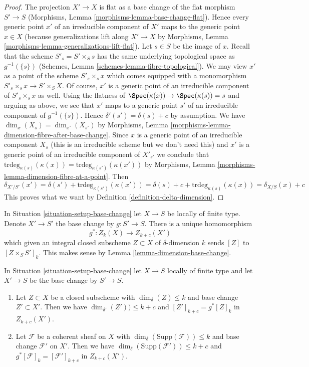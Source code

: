 \begin{proof}
The projection $X' \to X$ is flat as a base change of the flat morphism
$S' \to S$ (Morphisms, Lemma \ref{morphisms-lemma-base-change-flat}).
Hence every generic point $x'$ of an irreducible
component of $X'$ maps to the generic point $x \in X$ (because generalizations
lift along $X' \to X$ by
Morphisms, Lemma \ref{morphisms-lemma-generalizations-lift-flat}).
Let $s \in S$ be the image of $x$.
Recall that the scheme $S'_s = S' \times_S s$
has the same underlying topological space as $g^{-1}(\{s\})$
(Schemes, Lemma \ref{schemes-lemma-fibre-topological}).
We may view $x'$ as a point of the scheme $S'_s \times_s x$ which
comes equipped with a monomorphism $S'_s \times_s x \to S' \times_S X$.
Of course, $x'$ is a generic point of an irreducible component
of $S'_s \times_s x$ as well.
Using the flatness of $\Spec(\kappa(x)) \to \Spec(\kappa(s)) = s$
and arguing as above, we see that $x'$ maps to a generic point $s'$
of an irreducible component of $g^{-1}(\{s\})$. Hence
$\delta'(s') = \delta(s) + c$ by assumption.
We have $\dim_x(X_s) = \dim_{x'}(X_{s'})$ by
Morphisms, Lemma \ref{morphisms-lemma-dimension-fibre-after-base-change}.
Since $x$ is a generic point of an irreducible component $X_s$
(this is an irreducible scheme but we don't need this) and
$x'$ is a generic point of an irreducible component of $X'_{s'}$ we conclude
that $\text{trdeg}_{\kappa(s)}(\kappa(x)) = 
\text{trdeg}_{\kappa(s')}(\kappa(x'))$
by Morphisms, Lemma \ref{morphisms-lemma-dimension-fibre-at-a-point}.
Then
$$
\delta_{X'/S'}(x') = \delta(s') + \text{trdeg}_{\kappa(s')}(\kappa(x')) =
\delta(s) + c + \text{trdeg}_{\kappa(s)}(\kappa(x)) = \delta_{X/S}(x) + c
$$
This proves what we want by Definition \ref{definition-delta-dimension}.
\end{proof}

\noindent
In Situation \ref{situation-setup-base-change} let $X \to S$ be locally
of finite type. Denote $X' \to S'$ the base change by $g : S' \to S$.
There is a unique homomorphism
$$
g^* : Z_k(X) \longrightarrow Z_{k + c}(X')
$$
which given an integral closed subscheme $Z \subset X$ of
$\delta$-dimension $k$ sends $[Z]$ to $[Z \times_S S']_k$.
This makes sense by Lemma \ref{lemma-dimension-base-change}.

\begin{lemma}
\label{lemma-pullback-coherent-base-change}
In Situation \ref{situation-setup-base-change} let $X \to S$
locally of finite type and let $X' \to S$ be the base change by $S' \to S$.
\begin{enumerate}
\item Let $Z \subset X$ be a closed subscheme with
$\dim_\delta(Z) \leq k$ and base change $Z' \subset X'$. Then we have
$\dim_{\delta'}(Z')) \leq k + c$
and $[Z']_{k + c} = g^*[Z]_k$ in $Z_{k + c}(X')$.
\item Let $\mathcal{F}$ be a coherent sheaf on $X$ with
$\dim_\delta(\text{Supp}(\mathcal{F})) \leq k$ and base
change $\mathcal{F}'$ on $X'$.
Then we have $\dim_\delta(\text{Supp}(\mathcal{F}')) \leq k + c$
and $g^*[\mathcal{F}]_k = [\mathcal{F}']_{k + c}$
in $Z_{k + c}(X')$.
\end{enumerate}
\end{lemma}

